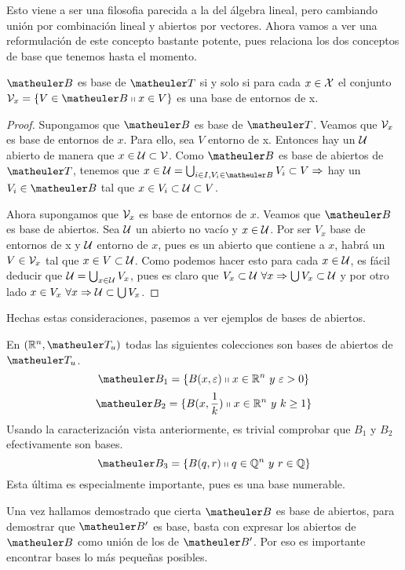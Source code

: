 Esto viene a ser una filosofia parecida a la del álgebra lineal, pero cambiando unión por combinación lineal y abiertos por vectores. Ahora vamos a ver una reformulación de este concepto bastante potente, pues relaciona los dos conceptos de base que tenemos hasta el momento.

\begin{prop}
	$\B$ es base de $\T$ si y solo si para cada $x \in \mathcal{X}$ el conjunto
	$\V_x = \{ V \in \B \tq  x \in V\}$ es una base de entornos de x.
\end{prop}
\begin{proof} 
	Supongamos que $\B$ es base de $\T$. Veamos que $\mathcal{V}_x$ es base de entornos de $x$. Para ello, sea $V$ entorno de x. Entonces hay un $\mathcal{U}$ abierto de manera que $x \in \mathcal{U} \subset \mathcal{V}$. Como $\B$ es base de abiertos de $\T$, tenemos que
	$x \in \U = \bigcup_{i \in I, V_i \in \B} V_i \subset V \Rightarrow$ hay un $V_i \in \B$ tal que $x \in V_i \subset \mathcal{U} \subset V$.
	
	Ahora supongamos que $\mathcal{V}_x$ es base de entornos de $x$. Veamos que $\B$ es base de abiertos. Sea $\mathcal{U}$ un abierto no vacío y $x \in \mathcal{U}$. Por ser $V_x$ base de entornos de x y $\mathcal{U}$ entorno de $x$, pues es un abierto que contiene a $x$, habrá un $V \in \mathcal{V}_x$ tal que $x \in V \subset \mathcal{U}$. Como podemos hacer esto para cada $x \in \mathcal{U}$, es fácil deducir que $\mathcal{U} = \bigcup_{x \in \mathcal{U}} V_x$, pues es claro que $V_x \subset \mathcal{U} \ \forall x \Rightarrow \bigcup V_x \subset \mathcal{U}$ y por otro lado $x \in V_x \ \forall x \Rightarrow \mathcal{U} \subset \bigcup V_x$.
\end{proof}

Hechas estas consideraciones, pasemos a ver ejemplos de bases de abiertos.
\begin{exa}
	En $( \R^n,\T_u )$ todas las siguientes colecciones son bases de abiertos de $\T_u$.
 	 $$\B_1=\{B(x, \varepsilon) \tq x \in \R^n\ y \ \varepsilon > 0\}$$
	 $$\B_2=\{B(x, \frac{1}{k}) \tq x \in \R^n\ y \ k \geq 1\}$$
	 Usando la caracterización vista anteriormente, es trivial comprobar que $B_1$ y $B_2$ efectivamente son bases.
	 $$\B_3=\{B(q, r) \tq q \in \Q^n\ y \ r \in \Q\}$$
	 Esta última es especialmente importante, pues es una base numerable.
\end{exa}

\begin{obs}
	Una vez hallamos demostrado que cierta $\B$ es base de abiertos, para demostrar que $\B'$ es base, basta con expresar los abiertos de $\B$ como unión de los de $\B'$. Por eso es importante encontrar bases lo más pequeñas posibles.  \qedhere
\end{obs}

